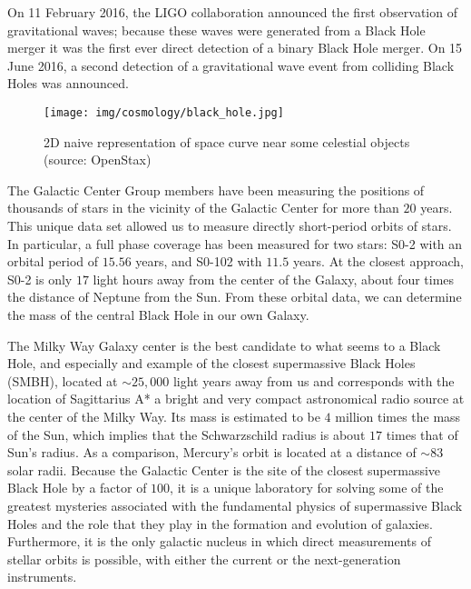 	On 11 February 2016, the LIGO collaboration announced the first observation of gravitational waves; because these waves were generated from a Black Hole merger it was the first ever direct detection of a binary Black Hole merger. On 15 June 2016, a second detection of a gravitational wave event from colliding Black Holes was announced.
	\begin{figure}[H]
		\centering
		\texttt{[image: img/cosmology/black\_hole.jpg]}	
		\caption[2D naive representation of space curve near some celestial objects]{2D naive representation of space curve near some celestial objects (source: OpenStax)}
	\end{figure}
	The Galactic Center Group members have been measuring the positions of thousands of stars in the vicinity of the Galactic Center for more than $20$ years. This unique data set allowed us to measure directly short-period orbits of stars. In particular, a full phase coverage has been measured for two stars: S0-2 with an orbital period of $15.56$ years, and S0-102 with $11.5$ years. At the closest approach, S0-2 is only $17$ light hours away from the center of the Galaxy, about four times the distance of Neptune from the Sun. From these orbital data, we can determine the mass of the central Black Hole in our own Galaxy.

	The Milky Way Galaxy center is the best candidate to what seems to a Black Hole, and especially and example of the closest supermassive Black Holes (SMBH), located at $\sim 25,000$ light years away from us and corresponds with the location of Sagittarius A* a bright and very compact astronomical radio source at the center of the Milky Way. Its mass is estimated to be $4$ million times the mass of the Sun, which implies that the Schwarzschild radius is about $17$ times that of Sun's radius. As a comparison, Mercury's orbit is located at a distance of $\sim 83$ solar radii. Because the Galactic Center is the site of the closest supermassive Black Hole by a factor of $100$, it is a unique laboratory for solving some of the greatest mysteries associated with the fundamental physics of supermassive Black Holes and the role that they play in the formation and evolution of galaxies. Furthermore, it is the only galactic nucleus in which direct measurements of stellar orbits is possible, with either the current or the next-generation instruments.
	
